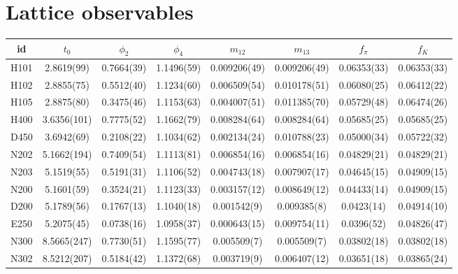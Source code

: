 
\chapter{Lattice observables}
\label{apex_obs}


\begin{sidewaystable}
\begin{center}
    \begin{tabular}{c c c c c c c c}
    id & $t_0$ & $\phi_2$ & $\phi_4$ & $m_{12}$ & $m_{13}$ & $f_{\pi}$ & $f_K$ \\
\toprule
H101 & 2.8619(99) & 0.7664(39) & 1.1496(59) & 0.009206(49) & 0.009206(49) & 0.06353(33) & 0.06353(33) \\
H102 & 2.8855(75) & 0.5512(40) & 1.1234(60) & 0.006509(54) & 0.010178(51) & 0.06080(25) & 0.06412(22) \\
H105 & 2.8875(80) & 0.3475(46) & 1.1153(63) & 0.004007(51) & 0.011385(70) & 0.05729(48) & 0.06474(26) \\
\midrule
H400 & 3.6356(101) & 0.7775(52) & 1.1662(79) & 0.008284(64) & 0.008284(64) & 0.05685(25) & 0.05685(25) \\
D450 & 3.6942(69) & 0.2108(22) & 1.1034(62) & 0.002134(24) & 0.010788(23) & 0.05000(34) & 0.05722(32) \\
\midrule
N202 & 5.1662(194) & 0.7409(54) & 1.1113(81) & 0.006854(16) & 0.006854(16) & 0.04829(21) & 0.04829(21) \\
N203 & 5.1519(55) & 0.5191(31) & 1.1106(52) & 0.004743(18) & 0.007907(17) & 0.04645(15) & 0.04909(15) \\
N200 & 5.1601(59) & 0.3524(21) & 1.1123(33) & 0.003157(12) & 0.008649(12) & 0.04433(14) & 0.04909(15) \\
D200 & 5.1789(56) & 0.1767(13) & 1.1040(18) & 0.001542(9) & 0.009385(8) & 0.0423(14) & 0.04914(10) \\
E250 & 5.2075(45) & 0.0738(16) & 1.0958(37) & 0.000643(15) & 0.009754(11) & 0.0396(52) & 0.04826(47) \\
\midrule
N300 & 8.5665(247) & 0.7730(51) & 1.1595(77) & 0.005509(7) & 0.005509(7) & 0.03802(18) & 0.03802(18) \\
N302 & 8.5212(207) & 0.5184(42) & 1.1372(68) & 0.003719(9) & 0.006407(12) & 0.03651(18) & 0.03865(24) \\

\end{tabular}
\end{center}
\end{sidewaystable}

